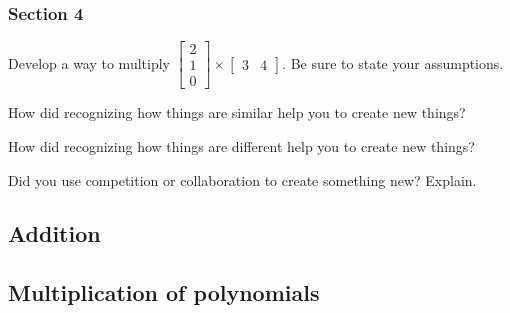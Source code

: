 \documentclass[12pt]{article}
\newcommand{\ssol}{\vspace{3em}}
\newcommand{\lsol}{\vspace{10em}}
\begin{document}
\begin{appendices}
\subsubsection*{Section 4}
\begin{question}
Develop a way to multiply $\begin{bmatrix}
2\\ 1 \\ 0
\end{bmatrix}
\times
\begin{bmatrix}
3 & 4
\end{bmatrix}$.  Be sure to state your assumptions.
\end{question}\lsol
\begin{multicols}{2}
\begin{question}
How did recognizing how things are similar help you to create new things?
\end{question}
\columnbreak
\begin{question}
How did recognizing how things are different help you to create new things?
\end{question}
\end{multicols}
\ssol

\begin{question}
Did you use competition or collaboration to create something new?  Explain.
\end{question}

\pagebreak


\subsection*{Addition}

\subsection*{Multiplication of polynomials}

\end{appendices}
\end{document}
